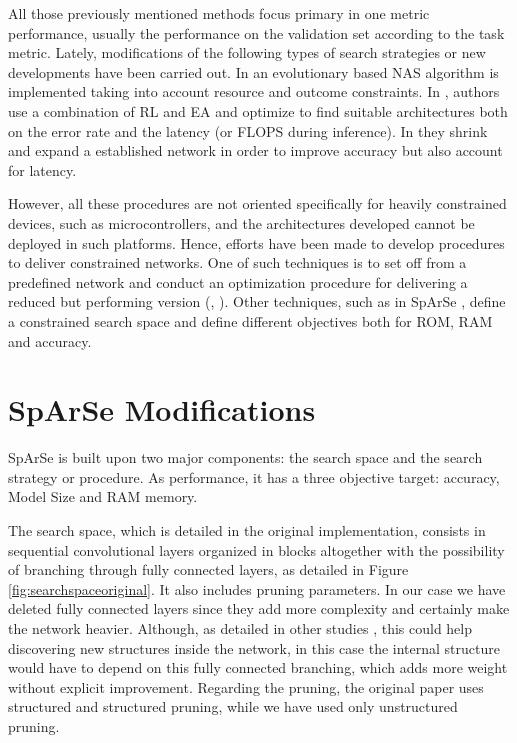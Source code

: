 \documentclass[a4paper, twocolumn]{article}
\begin{document}
All those previously mentioned methods focus primary in one metric performance, usually the performance on the validation set according to the task metric. Lately, modifications of the following types of search strategies or new developments have been carried out. In \cite{Elsken2018} an evolutionary based NAS algorithm is implemented taking into account resource and outcome constraints. In \cite{Chu2019}, authors use a combination of RL and EA and optimize to find suitable architectures both on the error rate and the latency (or FLOPS during inference). In \cite{Gordon2017} they shrink and expand a established network in order to improve accuracy but also account for latency.

However, all these procedures are not oriented specifically for heavily constrained devices, such as microcontrollers, and the architectures developed cannot be deployed in such platforms. Hence, efforts have been made to develop procedures to deliver constrained networks. One of such techniques is to set off from a predefined network and conduct an optimization procedure for delivering a reduced but performing version (\cite{Loni2020}, \cite{Cai2019f}). Other techniques, such as in SpArSe \cite{Fedorov2019}, define a constrained search space and define different objectives both for ROM, RAM and accuracy.


\section{SpArSe Modifications}\label{Sparsemod}

SpArSe is built upon two major components: the search space and the search strategy or procedure. As performance, it has a three objective target: accuracy, Model Size and RAM memory.

The search space, which is detailed in the original implementation, consists in sequential convolutional layers organized in blocks altogether with the possibility of branching through fully connected layers, as detailed in Figure \ref{fig:searchspaceoriginal}. It also includes pruning parameters. In our case we have deleted fully connected layers since they add more complexity and certainly make the network heavier. Although, as detailed in other studies \cite{Frankle2019}, this could help discovering new structures inside the network, in this case the internal structure would have to depend on this fully connected branching, which adds more weight without explicit improvement. Regarding the pruning, the original paper uses structured and structured pruning, while we have used only unstructured pruning.
\end{document}
